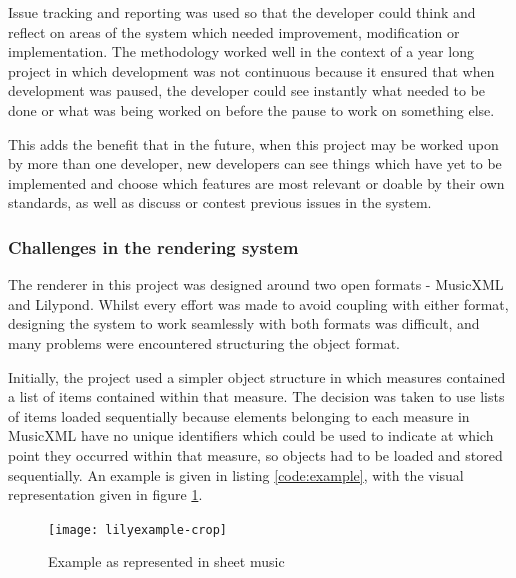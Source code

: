 Issue tracking and reporting was used so that the developer could think and reflect on areas of the system which needed improvement, modification or implementation. The methodology worked well in the context of a year long project in which development was not continuous because it ensured that when development was paused, the developer could see instantly what needed to be done or what was being worked on before the pause to work on something else. 

This adds the benefit that in the future, when this project may be worked upon by more than one developer, new developers can see things which have yet to be implemented and choose which features are most relevant or doable by their own standards, as well as discuss or contest previous issues in the system.


\subsubsection{Challenges in the rendering system}
The renderer in this project was designed around two open formats - MusicXML and Lilypond. Whilst every effort was made to avoid coupling with either format, designing the system to work seamlessly with both formats was difficult, and many problems were encountered structuring the object format.

Initially, the project used a simpler object structure in which measures contained a list of items contained within that measure. The decision was taken to use lists of items loaded sequentially because elements belonging to each measure in MusicXML have no unique identifiers which could be used to indicate at which point they occurred within that measure, so objects had to be loaded and stored sequentially. An example is given in listing \ref{code:example}, with the visual representation given in figure \ref{fig:lilyexample}.
    
    
\begin{figure}[H]
\centering
\texttt{[image: lilyexample-crop]}
\caption{Example as represented in sheet music}
\label{fig:lilyexample}	
\end{figure}


